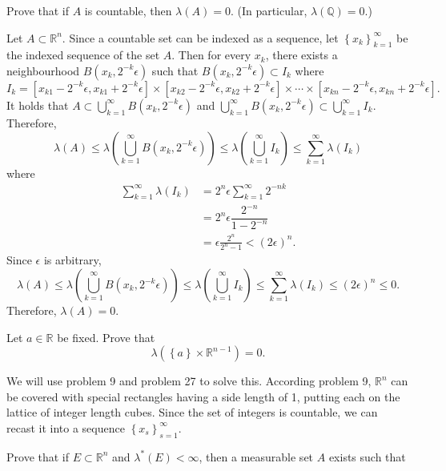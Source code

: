 \documentclass[answers]{exam}
\begin{document}
\begin{questions}
   \question
   Prove that if $A$ is countable, then $\lambda\left(A\right)= 0$. (In particular, $\lambda\left(\mathbb{Q}\right)=0$.)
   \begin{solution}
   Let $A \subset \mathbb{R}^{n}$. Since a countable set can be indexed as a sequence, let $\left\{x_{k} \right\}_{k=1}^{\infty}$ be the indexed sequence of the set $A$. Then for every $x_{k}$, there exists a neighbourhood $B\left(x_{k}, 2^{-k}\epsilon\right)$ such that $B\left(x_{k},2^{-k}\epsilon\right) \subset I_{k}$ where
   $$
   I_{k} = \left[x_{k1}-2^{-k}\epsilon, x_{k1}+2^{-k}\epsilon\right]\times \left[x_{k2}-2^{-k}\epsilon, x_{k2}+2^{-k}\epsilon\right] \times \cdots \times \left[x_{kn}-2^{-k}\epsilon, x_{kn}+2^{-k}\epsilon\right].
   $$
   It holds that $A \subset \bigcup_{k=1}^{\infty}B\left(x_{k},2^{-k}\epsilon\right)$ and $\bigcup_{k=1}^{\infty}B\left(x_{k},2^{-k}\epsilon\right) \subset \bigcup_{k=1}^{\infty}I_{k}$. Therefore,
   $$
   \lambda\left(A\right) \leq \lambda\left(\bigcup_{k=1}^{\infty}B\left(x_{k},2^{-k}\epsilon\right)\right) \leq \lambda\left(\bigcup_{k=1}^{\infty}I_{k}\right)\leq \sum_{k=1}^{\infty}\lambda\left(I_{k}\right) 
   $$
   where
   \begin{align*}
   \sum_{k=1}^{\infty}\lambda\left(I_{k}\right) &= 2^{n}\epsilon\sum_{k=1}^{\infty}2^{-nk}\\
   &= 2^{n}\epsilon \dfrac{2^{-n}}{1-2^{-n}}\\
   &= \epsilon \frac{2^{n}}{2^{n}-1} < \left(2\epsilon\right)^{n}.
   \end{align*}
   Since $\epsilon$ is arbitrary, 
   $$
   \lambda\left(A\right) \leq \lambda\left(\bigcup_{k=1}^{\infty}B\left(x_{k},2^{-k}\epsilon\right)\right) \leq \lambda\left(\bigcup_{k=1}^{\infty}I_{k}\right)\leq \sum_{k=1}^{\infty}\lambda\left(I_{k}\right) \leq \left(2\epsilon\right)^{n} \leq 0.
   $$
   Therefore, $\lambda\left(A\right) = 0$.
   \end{solution}
   \question
   Let $a \in \mathbb{R}$ be fixed. Prove that
   $$
   \lambda\left(\left\{a \right\} \times \mathbb{R}^{n-1} \right) = 0.
   $$
   \begin{solution}
   We will use problem 9 and problem 27 to solve this. According problem 9, $\mathbb{R}^{n}$ can be covered with special rectangles having  a side length of 1, putting each on the lattice of integer length cubes. Since the set of integers is countable, we can recast it into a sequence $\left\{x_{s} \right\}_{s=1}^{\infty}$. 
   \end{solution}
   \question
   Prove that if $E\subset \mathbb{R}^{n}$ and $\lambda^{*}\left(E\right)<\infty $, then a measurable set $A$ exists such that

\end{questions}
\end{document}

